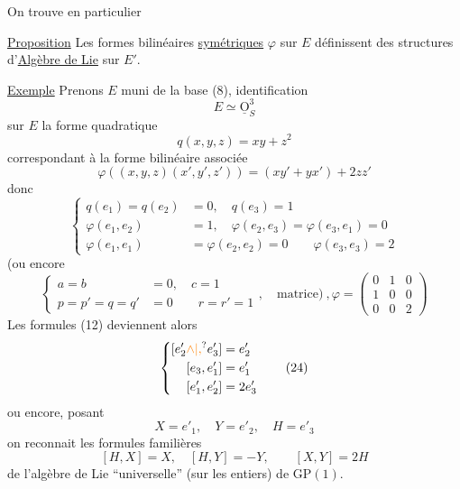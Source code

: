 On trouve en particulier

\uline{Proposition} Les formes bilinéaires \uline{symétriques} $\varphi$ sur $E$ définissent des structures d'\uline{Algèbre de Lie} sur $E'$.

\uline{Exemple} Prenons $E$ muni de la base (8),  identification
\[
 E\simeq\underline{\mathrm O}_S^3 \tag*{(20)}
\]
 sur $E$ la forme quadratique
\[
 q(x,y,z)=xy+z^2 \tag*{(21)}
\]
correspondant à la forme bilinéaire associée
\[
 \varphi((x,y,z)(x',y',z'))=(xy'+yx')+2zz' \tag*{(22)}
\]
donc
\[
\left\{\begin{aligned}
 q(e_1)=q(e_2)&=0,\quad q(e_3)=1\\
 \varphi(e_1,e_2)&=1,\quad \varphi(e_2,e_3)=\varphi(e_3,e_1)=0\\
 \varphi(e_1,e_1)&=\varphi(e_2,e_2)=0\qquad\varphi(e_3,e_3)=2
\end{aligned}\right. \tag*{(23)}
\]
(ou encore
\[
\left\{\begin{aligned}
 a=b&=0,\quad c=1\\
 p=p'=q=q'&=0\qquad r=r'=1
\end{aligned}\right.,\quad \text{matrice})\ ,\varphi=\begin{pmatrix}0&1&0\\1&0&0\\0&0&2\end{pmatrix} \tag*{(23 bis)}
\]
Les formules (12) deviennent alors 
\[
\left\{\begin{aligned}
 [e'_2\unsure{\wedge|,}e'_3]&=e'_2\\
 [e_3,e'_1]&=e'_1\\
 [e'_1,e'_2]&=2e'_3
\end{aligned}\right. \tag*{(24)}
\]
ou encore, posant
\[
 X=e'_1,\quad Y=e'_2,\quad H=e'_3 \tag*{(25)}
\]
on reconnait les formules familières
\[
 [H,X]=X,\quad[H,Y]=-Y,\qquad[X,Y]=2H \tag*{(26)}
\]
de l'algèbre de Lie  ``universelle'' (sur les entiers) de $\mathrm{GP}(1)$.

